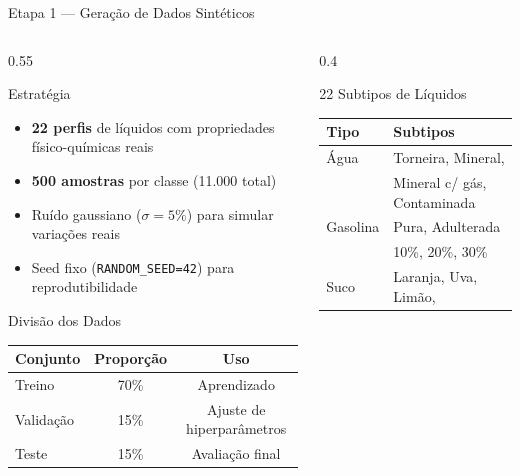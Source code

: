 \documentclass[aspectratio=169, 11pt]{beamer}
\begin{document}
\begin{frame}{Etapa 1 — Geração de Dados Sintéticos}
  \begin{columns}[T]
    \begin{column}{0.55\textwidth}
      \begin{block}{Estratégia}
        \begin{itemize}
          \item \textbf{22 perfis} de líquidos com propriedades físico-químicas reais
          \item \textbf{500 amostras} por classe (11.000 total)
          \item Ruído gaussiano ($\sigma = 5\%$) para simular variações reais
          \item Seed fixo (\texttt{RANDOM\_SEED=42}) para reprodutibilidade
        \end{itemize}
      \end{block}
      \vspace{0.3cm}
      \begin{block}{Divisão dos Dados}
        \begin{tabular}{lcc}
          \toprule
          \textbf{Conjunto} & \textbf{Proporção} & \textbf{Uso} \\
          \midrule
          Treino    & 70\% & Aprendizado \\
          Validação & 15\% & Ajuste de hiperparâmetros \\
          Teste     & 15\% & Avaliação final \\
          \bottomrule
        \end{tabular}
      \end{block}
    \end{column}
    \begin{column}{0.4\textwidth}
      \begin{block}{22 Subtipos de Líquidos}
        \scriptsize
        \begin{tabular}{ll}
          \toprule
          \textbf{Tipo} & \textbf{Subtipos} \\
          \midrule
          Água  & Torneira, Mineral, \\
                & Mineral c/ gás, Contaminada \\
          \midrule
          Gasolina & Pura, Adulterada \\
                   & 10\%, 20\%, 30\% \\
          \midrule
          Suco  & Laranja, Uva, Limão, \\

\end{tabular}
\end{block}
\end{column}
\end{columns}
\end{frame}
\end{document}
